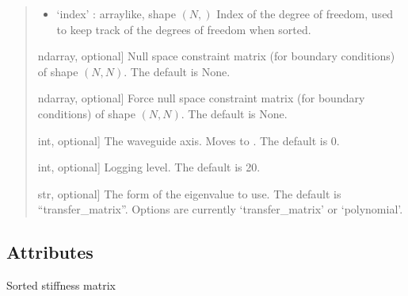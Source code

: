 \documentclass[letterpaper,10pt,english]{sphinxmanual}
\begin{document}
\begin{fulllineitems}
\begin{quote}
\begin{description}
\begin{description}
\begin{itemize}
\item {} 
\sphinxAtStartPar
‘index’ : array\sphinxhyphen{}like, shape \((N,)\)
Index of the degree of freedom, used to keep track of the degrees of freedom when sorted.

\end{itemize}

\sphinxlineitem{\sphinxstylestrong{null}}{[}ndarray, optional{]}
\sphinxAtStartPar
Null space constraint matrix (for boundary conditions) of shape \((N, N)\). The default is None.

\sphinxlineitem{\sphinxstylestrong{nullf}}{[}ndarray, optional{]}
\sphinxAtStartPar
Force null space constraint matrix (for boundary conditions) of shape \((N, N)\). The default is None.

\sphinxlineitem{\sphinxstylestrong{axis}}{[}int, optional{]}
\sphinxAtStartPar
The waveguide axis. Moves  to . The default is 0.

\sphinxlineitem{\sphinxstylestrong{logging\_level}}{[}int, optional{]}
\sphinxAtStartPar
Logging level. The default is 20.

\sphinxlineitem{\sphinxstylestrong{solver}}{[}str, optional{]}
\sphinxAtStartPar
The form of the eigenvalue to use. The default is “transfer\_matrix”.
Options are currently ‘transfer\_matrix’ or ‘polynomial’.

\end{description}

\begin{description}
\end{description}

\end{description}\end{quote}

\end{fulllineitems}



\subsection{Attributes}
\label{\detokenize{model:attributes}}

\begin{fulllineitems}
\label{\detokenize{model:pywfe.model.Model.K}}
\pysigstartsignatures
{}
\pysigstopsignatures
\sphinxAtStartPar
Sorted stiffness matrix

\end{fulllineitems}
\end{document}
